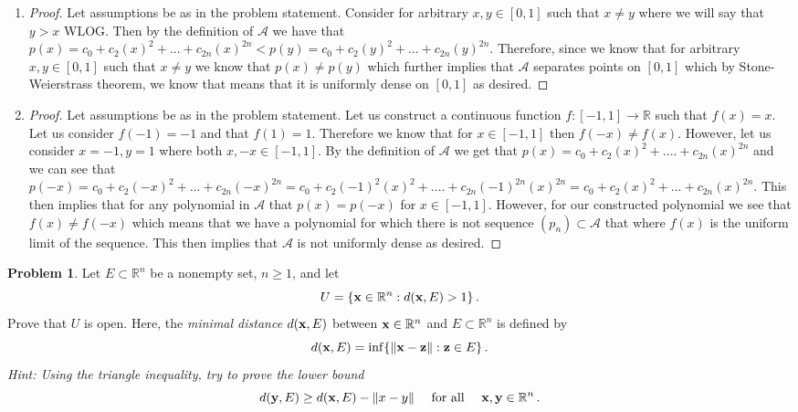 \documentclass[11pt]{article}
\theoremstyle{definition}
\newtheorem{problem}{Problem}
\newcommand{\R}{\mathbb{R}}
\begin{document}
\begin{enumerate}
    \item 
    
    \begin{proof}
    Let assumptions be as in the problem statement. Consider for arbitrary $x, y\in [0, 1]$ such that $x \neq y$ where we will say that $y > x$ WLOG. Then by the definition of $\mathcal{A}$ we have that $p(x) = c_0 + c_2(x)^2 + ... + c_{2n}(x)^{2n} < p(y) = c_0 + c_2(y)^2 + ... + c_{2n}(y)^{2n}$. Therefore, since we know that for arbitrary $x, y\in [0, 1]$ such that $x \neq y$ we know that $p(x) \neq p(y)$ which further implies that $\mathcal{A}$ separates points on $[0, 1]$ which by Stone-Weierstrass theorem, we know that means that it is uniformly dense on $[0, 1]$ as desired.
    \end{proof}
    
    \item
    
    \begin{proof}
    Let assumptions be as in the problem statement. Let us construct a continuous function $f: [-1, 1] \to \R$ such that $f(x) = x$. Let us consider $f(-1) = -1$ and that $f(1) = 1$. Therefore we know that for $x\in [-1, 1]$ then $f(-x) \neq f(x)$. However, let us consider $x = -1, y = 1$ where both $x, -x\in [-1, 1]$. By the definition of $\mathcal{A}$ we get that $p(x) = c_0 + c_2(x)^2 + .... + c_{2n}(x)^{2n}$ and we can see that $p(-x) = c_0 + c_2(-x)^2 + ... + c_{2n}(-x)^{2n} = c_0 + c_2(-1)^2(x)^2 + .... + c_{2n}(-1)^{2n}(x)^{2n} = c_0 + c_2(x)^2 + ... + c_{2n}(x)^{2n}$. This then implies that for any polynomial in $\mathcal{A}$ that $p(x) = p(-x)$ for $x\in [-1, 1]$. However, for our constructed polynomial we see that $f(x) \neq f(-x)$ which means that we have a polynomial for which there is not sequence $(p_n)\subset \mathcal{A}$ that where $f(x)$ is the uniform limit of the sequence. This then implies that $\mathcal{A}$ is not uniformly dense as desired.
    \end{proof}
    
\end{enumerate}

\pagebreak
\begin{problem}
Let $E \subset \mathbb R^n$ be a nonempty set, $n \geq 1$, and let 
\[
U = \{ {\bf x} \in \mathbb R^n : d({\bf x}, E) > 1\} \,. 
\]
Prove that $U$ is open. Here, the \emph{minimal distance} $d({\bf x}, E)$ between ${\bf x} \in \R^n$ and $E \subset \R^n$ is defined by
\[
d({\bf x}, E) = \inf\{ \| {\bf x} - {\bf z} \| : {\bf z} \in E\} \,. 
\]
{\it Hint: Using the triangle inequality, try to prove the lower bound
\[
d({\bf y}, E) \geq d({\bf x}, E) - \| x - y \| \quad \text{ for all } \quad {\bf x}, {\bf y} \in \R^n \, . 
\]}
\end{problem}
\end{document}
